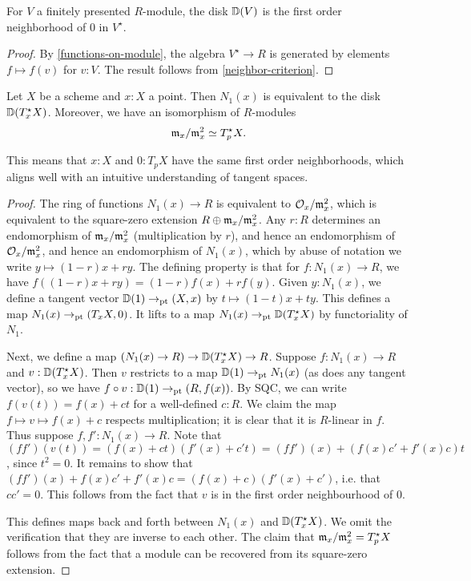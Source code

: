 \begin{lemma}
For $V$ a finitely presented $R$-module, the disk $\mathbb{D}(V)$ is the
first order neighborhood of $0$ in $V^\star$.
\end{lemma}
\begin{proof}
By \cref{functions-on-module}, the algebra $V^\star \to R$ is generated by
elements $f \mapsto f(v)$ for $v : V$. The result follows from \cref{neighbor-criterion}.
\end{proof}

\begin{lemma}\label{maximal-cotangent}
Let $X$ be a scheme and $x : X$ a point. 
Then $N_1(x)$ is equivalent to the
disk $\mathbb{D}(T^\star_x X)$. Moreover, we have an isomorphism
of $R$-modules
\[ \mathfrak{m}_x / \mathfrak{m}_x^2 \simeq T^\star_p X. \]
\end{lemma}
This means that $x : X$ and $0 : T_p X$ have the same first order neighborhoods,
which aligns well with an intuitive understanding of tangent spaces.
\begin{proof} %
The ring of functions $N_1(x) \to R$ is equivalent to
$\mathcal{O}_x / \mathfrak{m}_x^2$, which is equivalent to the square-zero extension
$R \oplus \mathfrak{m}_x / \mathfrak{m}_x^2$. Any $r : R$ determines an endomorphism of
$\mathfrak{m}_x / \mathfrak{m}_x^2$ (multiplication by $r$), and hence an endomorphism
of $\mathcal{O}_x / \mathfrak{m}_x^2$, and hence an endomorphism of $N_1(x)$, which
by abuse of notation we write $y \mapsto (1-r)x + ry$. 
The defining property is that
for $f : N_1(x) \to R$, we have $f((1-r)x + ry) = (1-r)f(x) + rf(y)$.
Given $y : N_1(x)$,
we define a tangent vector $\mathbb{D}(1) \to_{\mathrm{pt}} (X,x)$ by $t \mapsto (1-t)x + ty$.
This defines a map $N_1(x) \to_{\mathrm{pt}} (T_x X, 0)$. It lifts to
a map $N_1(x) \to_{\mathrm{pt}} \mathbb{D}(T^\star_x X)$ by functoriality of $N_1$.

Next, we define a map $(N_1(x) \to R) \to \mathbb{D}(T^\star_x X) \to R$.
Suppose $f : N_1(x) \to R$ and $v : \mathbb{D}(T^\star_x X)$.
Then $v$ restricts to a map $\mathbb{D}(1) \to_{\mathrm{pt}} N_1(x)$
(as does any tangent vector),
so we have $f \circ v : \mathbb{D}(1) \to_{\mathrm{pt}} (R,f(x))$.
By SQC, we can write $f(v(t)) = f(x) + ct$ for a well-defined $c : R$.
We claim the map $f \mapsto v \mapsto f(x) + c$ respects multiplication;
it is clear that it is $R$-linear in $f$. Thus suppose $f, f' : N_1(x) \to R$.
Note that $(ff')(v(t)) = (f(x) + ct)(f'(x)+c't) = (ff')(x) + (f(x)c' + f'(x)c)t$,
since $t^2 = 0$. It remains to show that
$(ff')(x) + f(x)c' + f'(x)c = (f(x) + c)(f'(x) + c')$, i.e. that
$cc' = 0$. This follows from the fact that $v$ is in the first order neighbourhood
of $0$.

This defines maps back and forth between
$N_1(x)$ and $\mathbb{D}(T^\star_x X)$. We omit the verification that they are inverse to
each other. The claim that $\mathfrak{m}_x / \mathfrak{m}_x^2 = T^\star_p X$ follows from the
fact that a module can be recovered from its square-zero extension.
\end{proof}

